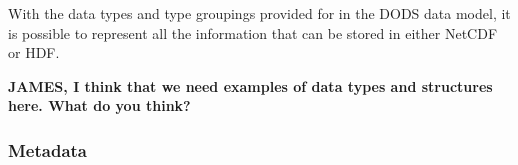 \documentclass{article}
\begin{document}
With the data types and type groupings provided for in the \ac{DODS} data 
model, it is possible to represent all the information that can be stored 
in either \acs{NetCDF} or \acs{HDF}.

{\bf JAMES, I think that we need examples of data types and structures
here. What do you think?}

\subsubsection{Metadata}
\label{md}

% 
\end{document}

